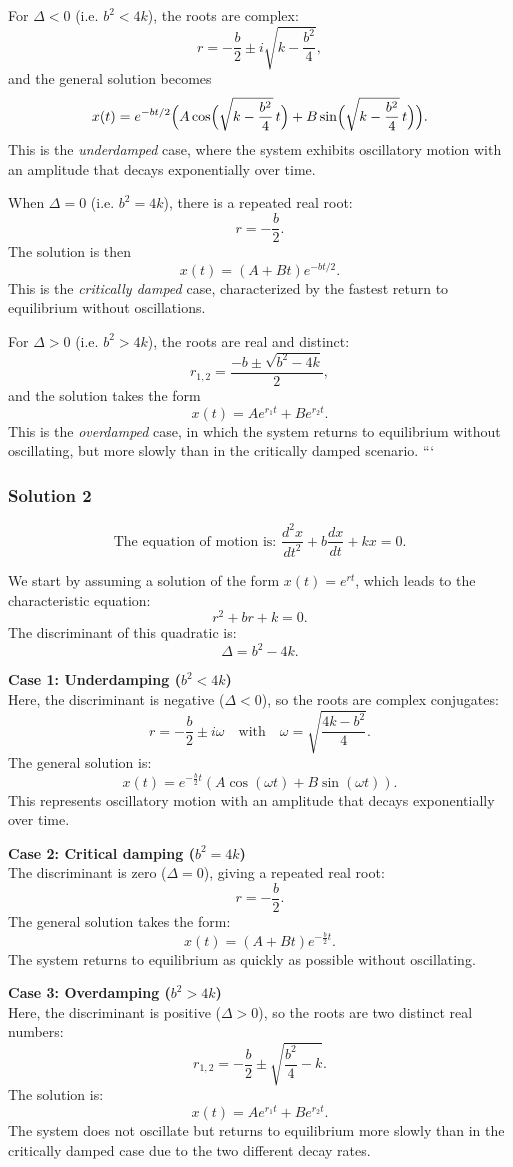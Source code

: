 \documentclass{article}
\begin{document}
For \(\Delta < 0\) (i.e. \(b^2 < 4k\)), the roots are complex:
\[
r = -\frac{b}{2} \pm i\sqrt{k-\frac{b^2}{4}},
\]
and the general solution becomes
\[
x(t) = e^{-b t/2}\Bigl(A\cos\Bigl(\sqrt{k-\frac{b^2}{4}}\,t\Bigr) + B\sin\Bigl(\sqrt{k-\frac{b^2}{4}}\,t\Bigr)\Bigr).
\]
This is the \emph{underdamped} case, where the system exhibits oscillatory motion with an amplitude that decays exponentially over time.

When \(\Delta = 0\) (i.e. \(b^2 = 4k\)), there is a repeated real root:
\[
r = -\frac{b}{2}.
\]
The solution is then
\[
x(t) = (A+Bt)e^{-b t/2}.
\]
This is the \emph{critically damped} case, characterized by the fastest return to equilibrium without oscillations.

For \(\Delta > 0\) (i.e. \(b^2 > 4k\)), the roots are real and distinct:
\[
r_{1,2} = \frac{-b \pm \sqrt{b^2-4k}}{2},
\]
and the solution takes the form
\[
x(t) = A e^{r_1 t} + B e^{r_2 t}.
\]
This is the \emph{overdamped} case, in which the system returns to equilibrium without oscillating, but more slowly than in the critically damped scenario.
```

\subsubsection{Solution 2}
\[
\text{The equation of motion is: } \frac{d^2x}{dt^2} + b\frac{dx}{dt} + kx = 0.
\]

We start by assuming a solution of the form \(x(t) = e^{rt}\), which leads to the characteristic equation:
\[
r^2 + br + k = 0.
\]
The discriminant of this quadratic is:
\[
\Delta = b^2 - 4k.
\]

\textbf{Case 1: Underdamping (\(b^2 < 4k\))} \\
Here, the discriminant is negative (\(\Delta < 0\)), so the roots are complex conjugates:
\[
r = -\frac{b}{2} \pm i\omega \quad \text{with} \quad \omega = \sqrt{\frac{4k - b^2}{4}}.
\]
The general solution is:
\[
x(t) = e^{-\frac{b}{2}t}\left(A\cos(\omega t) + B\sin(\omega t)\right).
\]
This represents oscillatory motion with an amplitude that decays exponentially over time.

\textbf{Case 2: Critical damping (\(b^2 = 4k\))} \\
The discriminant is zero (\(\Delta = 0\)), giving a repeated real root:
\[
r = -\frac{b}{2}.
\]
The general solution takes the form:
\[
x(t) = (A + Bt)e^{-\frac{b}{2}t}.
\]
The system returns to equilibrium as quickly as possible without oscillating.

\textbf{Case 3: Overdamping (\(b^2 > 4k\))} \\
Here, the discriminant is positive (\(\Delta > 0\)), so the roots are two distinct real numbers:
\[
r_{1,2} = -\frac{b}{2} \pm \sqrt{\frac{b^2}{4} - k}.
\]
The solution is:
\[
x(t) = A e^{r_1 t} + B e^{r_2 t}.
\]
The system does not oscillate but returns to equilibrium more slowly than in the critically damped case due to the two different decay rates.
\end{document}
